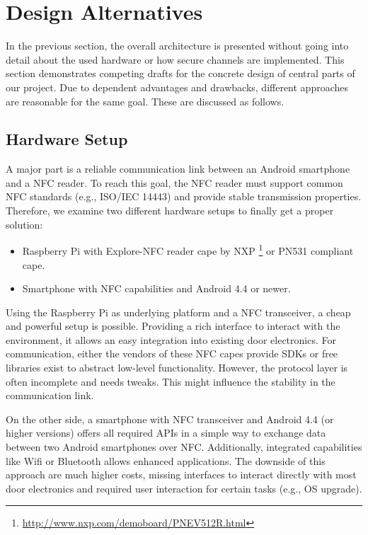 \section{Design Alternatives}\label{sec:alt}
In the previous section, the overall architecture is presented without going into detail about the used hardware or how secure channels are implemented.
This section demonstrates competing drafts for the concrete design of central parts of our project. 
Due to dependent advantages and drawbacks, different approaches are reasonable for the same goal. These are discussed as follows.


\subsection{Hardware Setup}
A major part is a reliable communication link between an Android smartphone and a NFC reader.
To reach this goal, the NFC reader must support common NFC standards (e.g., ISO/IEC 14443) and provide stable transmission properties.
Therefore, we examine two different hardware setups to finally get a proper solution:
%
\begin{itemize}
	\item Raspberry Pi with Explore-NFC reader cape by NXP \footnote{\url{http://www.nxp.com/demoboard/PNEV512R.html}} or PN531 compliant cape.
	\item Smartphone with NFC capabilities and Android 4.4 or newer.
\end{itemize}
%
Using the Raspberry Pi as underlying platform and a NFC transceiver, a cheap and powerful setup is possible.
Providing a rich interface to interact with the environment, it allows an easy integration into existing door electronics.
For communication, either the vendors of these NFC capes provide SDKs or free libraries exist to abstract low-level functionality. 
However, the protocol layer is often incomplete and needs tweaks. This might influence the stability in the communication link.

On the other side, a smartphone with NFC transceiver and Android 4.4 (or higher versions) offers all required APIs in a simple way to exchange data between two Android smartphones over NFC.
Additionally, integrated capabilities like Wifi or Bluetooth allows enhanced applications. The downside of this approach are much higher costs, missing interfaces to interact directly with most door electronics and required user interaction for certain tasks (e.g., OS upgrade).



